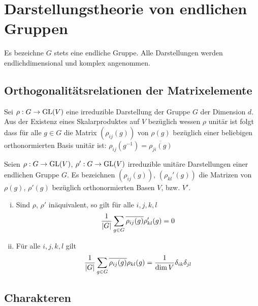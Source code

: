 \section{Darstellungstheorie von endlichen Gruppen}

Es bezeichne $G$ stets eine endliche Gruppe. Alle Darstellungen werden
endlichdimensional und komplex angenommen.

\subsection{Orthogonalitätsrelationen der Matrixelemente}

\begin{satz}
    Sei $\rho: G \rightarrow \text{GL}(V)$ eine irreduzible Darstellung der Gruppe $G$
    der Dimension $d$. Aus der Existenz eines Skalarproduktes auf $V$ bezüglich
    wessen $\rho$ unitär ist folgt dass für alle $g \in G$ die Matrix
    $(\rho_{ij}(g))$ von $\rho(g)$ bezüglich einer beliebigen orthonormierten
    Basis unitär ist: $\rho_{ij}(g^{-1}) = \overline{\rho_{ji}(g)}$
\end{satz}

\begin{satz}
    Seien $\rho: G \rightarrow \text{GL}(V)$, $\rho' : G \rightarrow \text{GL}(V)$ irreduzible
    unitäre Darstellungen einer endlichen Gruppe $G$. Es bezeichnen $(\rho_{ij}(g))$,
    $(\rho_{kl}' (g))$ die Matrizen von $\rho(g)$, $\rho'(g)$ bezüglich orthonormierten
    Basen $V$, bzw. $V'$.
    \begin{enumerate}[(i)]
        \item Sind $\rho$, $\rho'$ inäquivalent, so gilt für alle $i,j,k,l$
            \begin{align*}
                \frac{1}{\left\vert G \right\vert} \sum_{g \in G} \overline{\rho_{ij}(g)} \rho_{kl}' (g) = 0
            \end{align*}
        \item Für alle $i,j,k,l$ gilt
            \begin{align*}
                \frac{1}{\left\vert G \right\vert} \sum_{g \in G} \overline{\rho_{ij}(g)} \rho_{kl}(g) = \frac{1}{\dim V} \delta_{ik} \delta_{jl}
            \end{align*}
    \end{enumerate}
\end{satz}

\subsection{Charakteren}


